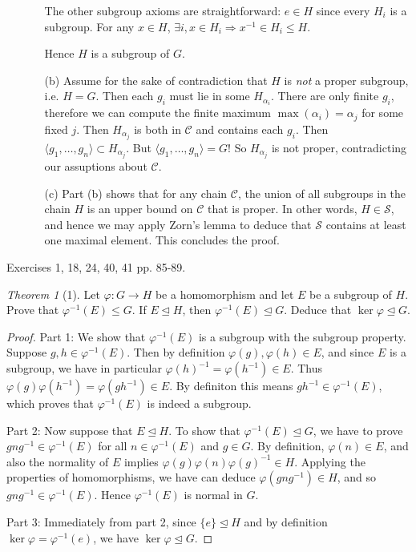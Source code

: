 \documentclass[12pt]{article}
\theoremstyle{remark}
\theoremstyle{named}
\newtheorem*{theorem}{Theorem}
\renewcommand{\implies}{\Rightarrow}
\newcommand{\normal}{\trianglelefteq}
\begin{document}
\begin{enumerate}
\begin{enumerate}
        The other subgroup axioms are straightforward: \(e \in H\) since every \(H_i\) is a subgroup. For any \(x \in H\), \(\exists i, x \in H_i \implies x^{-1} \in H_i \le H\). 
        
        Hence \(H\) is a subgroup of \(G\).

        \item[(b)] Assume for the sake of contradiction that \(H\) is \textit{not} a proper subgroup, i.e. \(H = G\). Then each \(g_i\) must lie in some \(H_{\alpha_i}\). There are only finite \(g_i\), therefore we can compute the finite maximum \(\max (\alpha_i) = \alpha_j\) for some fixed \(j\). Then \(H_{\alpha_j}\) is both in \(\mathcal C\) and contains each \(g_i\). 
        Then \(\langle g_1, \dots, g_n\rangle \subset H_{\alpha_j}\). But \(\langle g_1, \dots, g_n\rangle = G\)! So \(H_{\alpha_j}\) is not proper, contradicting our assuptions about \(\mathcal C\).
          
        \item[(c)] Part (b) shows that for any chain \(\mathcal C\), the union of all subgroups in the chain \(H\) is an upper bound on \(\mathcal C\) that is proper. In other words, \(H \in \mathcal S\), and hence we may apply Zorn's lemma to deduce that \(\mathcal S\) contains at least one maximal element. This concludes the proof.
    \end{enumerate}
\end{enumerate}

Exercises 1, 18, 24, 40, 41 pp. 85-89.

\begin{theorem}[1]
    Let \(\varphi : G \to H\) be a homomorphism and let \(E\) be a subgroup of \(H\). Prove that \(\varphi^{-1}(E) \le G\). If \(E \trianglelefteq H\), then \(\varphi^{-1}(E) \normal G\). Deduce that \(\ker \varphi \normal G\).
\end{theorem}

\begin{proof}
    Part 1: We show that \(\varphi^{-1}(E)\) is a subgroup with the subgroup property. Suppose \(g, h \in \varphi^{-1}(E)\). Then by definition \(\varphi(g), \varphi(h) \in E\), and since \(E\) is a subgroup, we have in particular \(\varphi(h)^{-1} = \varphi(h^{-1}) \in E\). Thus \(\varphi(g)\varphi(h^{-1}) = \varphi(gh^{-1}) \in E\). By definiton this means \(gh^{-1} \in \varphi^{-1}(E)\), which proves that \(\varphi^{-1}(E)\) is indeed a subgroup.

    Part 2: Now suppose that \(E \normal H\). To show that \(\varphi^{-1}(E) \normal G\), we have to prove \(gng^{-1} \in \varphi^{-1}(E)\) for all \(n \in \varphi^{-1}(E)\) and \(g \in G\). By definition, \(\varphi(n) \in E\), and also the normality of \(E\) implies \(\varphi(g)\varphi(n)\varphi(g)^{-1} \in H\). Applying the properties of homomorphisms, we have can deduce \(\varphi(gng^{-1}) \in H\), and so \(gng^{-1} \in \varphi^{-1}(E)\). Hence \(\varphi^{-1}(E)\) is normal in \(G\).

    Part 3: Immediately from part 2, since \(\{e\} \normal H\) and by definition \(\ker \varphi = \varphi^{-1}(e)\), we have \(\ker \varphi \normal G\).
\end{proof}
\end{document}
